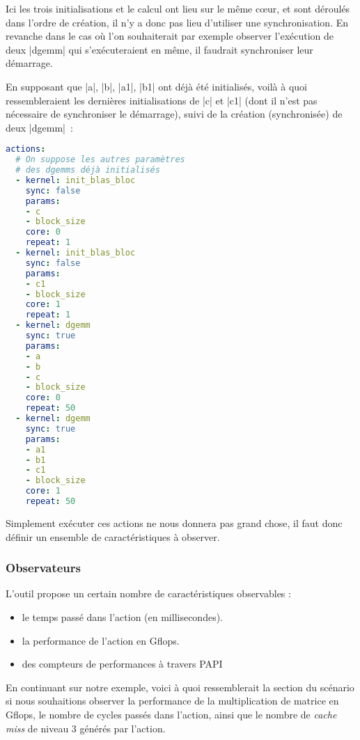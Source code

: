 Ici les trois initialisations et le calcul ont lieu sur le même cœur, et sont déroulés dans l'ordre de création, il n'y a donc pas lieu d'utiliser une synchronisation.
En revanche dans le cas où l'on souhaiterait par exemple observer l'exécution de deux |dgemm| qui s'exécuteraient en même, il faudrait synchroniser leur démarrage.

En supposant que |a|, |b|, |a1|, |b1| ont déjà été initialisés, voilà à quoi ressembleraient les dernières initialisations de |c| et |c1| (dont il n'est pas nécessaire de synchroniser le démarrage), suivi de la création (synchronisée) de deux |dgemm|~:
\begin{lstlisting}[language=yaml,caption=Exemple de déclaration d'actions synchronisées,label=lst:tool:actions-example-sync]
actions:
  # On suppose les autres paramètres
  # des dgemms déjà initialisés
  - kernel: init_blas_bloc
    sync: false
    params: 
    - c
    - block_size
    core: 0
    repeat: 1
  - kernel: init_blas_bloc
    sync: false
    params: 
    - c1
    - block_size
    core: 1
    repeat: 1
  - kernel: dgemm
    sync: true
    params: 
    - a
    - b
    - c
    - block_size
    core: 0
    repeat: 50
  - kernel: dgemm
    sync: true
    params: 
    - a1
    - b1
    - c1
    - block_size
    core: 1
    repeat: 50
\end{lstlisting}


Simplement exécuter ces actions ne nous donnera pas grand chose, il faut donc définir un ensemble de caractéristiques à observer.

\subsubsection{Observateurs}

L'outil propose un certain nombre de caractéristiques observables :

\begin{itemize}
  \item le temps passé dans l'action (en millisecondes).
  \item la performance de l'action en Gflops.
  \item des compteurs de performances à travers PAPI
\end{itemize}

En continuant sur notre exemple, voici à quoi ressemblerait la section du scénario si nous souhaitions observer la performance de la multiplication de matrice en Gflops, le nombre de cycles passés dans l'action, ainsi que le nombre de \emph{cache miss} de niveau 3 générés par l'action.

